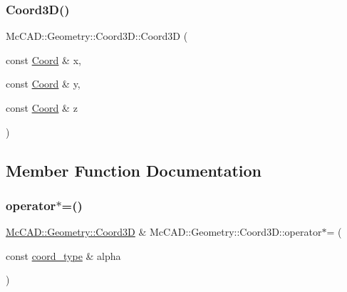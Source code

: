 \mbox{\label{classMcCAD_1_1Geometry_1_1Coord3D_ad2eb234f063d45a9d6c5b1937a175ae5}} 
\subsubsection{\texorpdfstring{Coord3\+D()}{Coord3D()}\hspace{0.1cm}{\footnotesize\ttfamily [4/4]}}
{\footnotesize\ttfamily Mc\+C\+A\+D\+::\+Geometry\+::\+Coord3\+D\+::\+Coord3D (\begin{DoxyParamCaption}\item[{const \hyperlink{classMcCAD_1_1Geometry_1_1Coord}{Coord} \&}]{x,  }\item[{const \hyperlink{classMcCAD_1_1Geometry_1_1Coord}{Coord} \&}]{y,  }\item[{const \hyperlink{classMcCAD_1_1Geometry_1_1Coord}{Coord} \&}]{z }\end{DoxyParamCaption})}



\subsection{Member Function Documentation}
\mbox{\label{classMcCAD_1_1Geometry_1_1Coord3D_a9ccf5626626917acdf05774d5516d271}} 
\subsubsection{\texorpdfstring{operator$\ast$=()}{operator*=()}\hspace{0.1cm}{\footnotesize\ttfamily [1/2]}}
{\footnotesize\ttfamily \hyperlink{classMcCAD_1_1Geometry_1_1Coord3D}{Mc\+C\+A\+D\+::\+Geometry\+::\+Coord3D} \& Mc\+C\+A\+D\+::\+Geometry\+::\+Coord3\+D\+::operator$\ast$= (\begin{DoxyParamCaption}\item[{const \hyperlink{namespaceMcCAD_1_1Geometry_ac043b37a4a7e849fca22869e1982d2f8}{coord\+\_\+type} \&}]{alpha }\end{DoxyParamCaption})}



